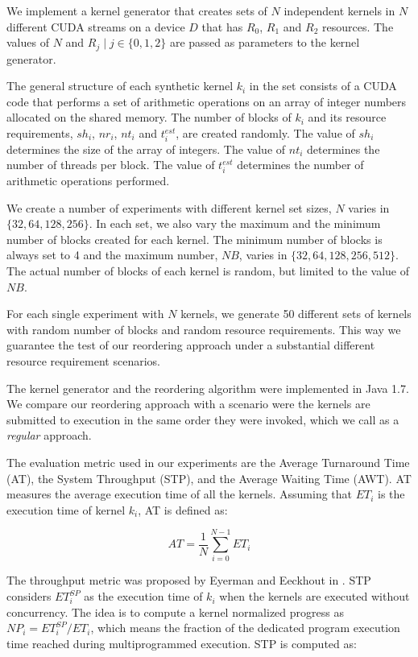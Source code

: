 \documentclass[conference]{IEEEtran}
\begin{document}
We implement a kernel generator that creates sets of $N$ independent kernels in $N$ different CUDA streams on a device $D$ that has $R_0$, $R_1$ and $R_2$ resources. The values of $N$ and $R_j \mid j \in \{0,1,2\}$ are passed as parameters to the kernel generator.

The general structure of each synthetic kernel $k_i$  in the set consists of a CUDA code that performs a set of arithmetic operations on an array of integer numbers allocated on the shared memory.
The number of blocks of $k_i$ and its resource requirements, $sh_i$, $nr_i$, $nt_i$ and $t^{est}_i$, are created randomly. The value of $sh_i$ determines the size of the array of integers. The value of $nt_i$ determines the number of threads per block. The value of $t^{est}_i$ determines the number of arithmetic operations performed. 

We create a number of experiments with different kernel set sizes, $N$ varies in $\{32,64,128,256\}$. In each set, we also vary the maximum and the minimum number of blocks created for each kernel. The minimum number of blocks is always set to 4 and the maximum number, $NB$, varies in  $\{32,64,128,256,512\}$. The actual number of blocks of each kernel is random, but limited to the value of $NB$. 

For each single experiment with $N$ kernels, we generate 50 different sets of kernels with random number of blocks and random resource requirements. This way we guarantee the test of our reordering approach under a substantial different resource requirement scenarios. 

The kernel generator and the reordering algorithm were implemented in Java 1.7. We compare our reordering approach with a scenario were the kernels are submitted to execution in the same order they were invoked, which we call as a \textit{regular} approach. 

The evaluation metric used in our experiments are the Average Turnaround Time (AT), the System Throughput (STP), and the Average Waiting Time (AWT). AT measures the average execution time of all the kernels. Assuming that $ET_i$ is the execution time of kernel $k_i$, AT is defined as:

\begin{equation}
AT = \frac{1}{N} \sum_{i=0}^{N-1} {ET_i}
\end{equation}

The throughput metric was proposed by Eyerman and Eeckhout in \cite{Eyerman:2008}. STP considers $ET^{SP}_i$ as the execution time of $k_i$ when the kernels are executed without concurrency.
The idea is to compute a kernel normalized progress as $NP_i=ET^{SP}_i/ET_i$, which means the fraction of the dedicated program execution time reached during multiprogrammed execution. STP is computed as:
\end{document}
